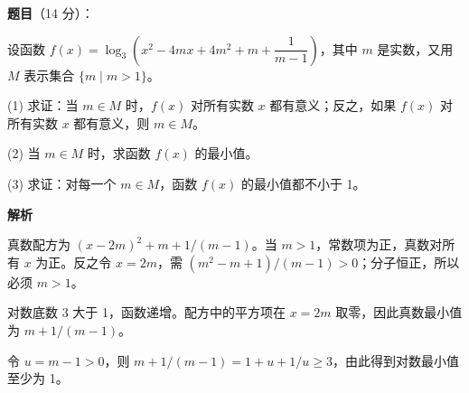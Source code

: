 \begin{answer}

\textbf{题目}（14 分）：

设函数 $f(x)=\log_3\!\left(x^2-4mx+4m^2+m+\dfrac1{m-1}\right)$，其中 $m$ 是实数，又用 $M$ 表示集合 $\{m\mid m>1\}$。

(1) 求证：当 $m\in M$ 时，$f(x)$ 对所有实数 $x$ 都有意义；反之，如果 $f(x)$ 对所有实数 $x$ 都有意义，则 $m\in M$。

(2) 当 $m\in M$ 时，求函数 $f(x)$ 的最小值。

(3) 求证：对每一个 $m\in M$，函数 $f(x)$ 的最小值都不小于 1。

\textbf{解析}


真数配方为 $(x-2m)^2+m+1/(m-1)$。当 $m>1$，常数项为正，真数对所有 $x$ 为正。反之令 $x=2m$，需 $(m^2-m+1)/(m-1)>0$；分子恒正，所以必须 $m>1$。


对数底数 3 大于 1，函数递增。配方中的平方项在 $x=2m$ 取零，因此真数最小值为 $m+1/(m-1)$。


令 $u=m-1>0$，则 $m+1/(m-1)=1+u+1/u\ge3$，由此得到对数最小值至少为 1。




\end{answer}
